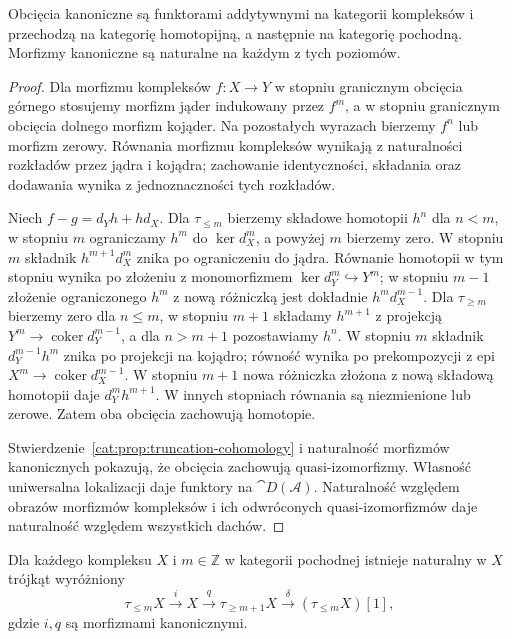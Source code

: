 \begin{stwierdzenie}\label{cat:prop:truncation-functors}
Obcięcia kanoniczne są funktorami addytywnymi na kategorii kompleksów i przechodzą na kategorię homotopijną, a następnie na kategorię pochodną. Morfizmy kanoniczne są naturalne na każdym z tych poziomów.
\end{stwierdzenie}
\begin{proof}
Dla morfizmu kompleksów $f:X\to Y$ w stopniu granicznym obcięcia górnego stosujemy morfizm jąder indukowany przez $f^m$, a w stopniu granicznym obcięcia dolnego morfizm kojąder. Na pozostałych wyrazach bierzemy $f^n$ lub morfizm zerowy. Równania morfizmu kompleksów wynikają z naturalności rozkładów przez jądra i kojądra; zachowanie identyczności, składania oraz dodawania wynika z jednoznaczności tych rozkładów.

Niech $f-g=d_Yh+hd_X$. Dla $\tau_{\le m}$ bierzemy składowe homotopii $h^n$ dla $n<m$, w stopniu $m$ ograniczamy $h^m$ do $\ker d_X^m$, a powyżej $m$ bierzemy zero. W stopniu $m$ składnik $h^{m+1}d_X^m$ znika po ograniczeniu do jądra. Równanie homotopii w tym stopniu wynika po złożeniu z monomorfizmem $\ker d_Y^m\hookrightarrow Y^m$; w stopniu $m-1$ złożenie ograniczonego $h^m$ z nową różniczką jest dokładnie $h^md_X^{m-1}$. Dla $\tau_{\ge m}$ bierzemy zero dla $n\le m$, w stopniu $m+1$ składamy $h^{m+1}$ z projekcją $Y^m\to\operatorname{coker}d_Y^{m-1}$, a dla $n>m+1$ pozostawiamy $h^n$. W stopniu $m$ składnik $d_Y^{m-1}h^m$ znika po projekcji na kojądro; równość wynika po prekompozycji z epi $X^m\to\operatorname{coker}d_X^{m-1}$. W stopniu $m+1$ nowa różniczka złożona z nową składową homotopii daje $d_Y^mh^{m+1}$. W innych stopniach równania są niezmienione lub zerowe. Zatem oba obcięcia zachowują homotopie.

Stwierdzenie~\ref{cat:prop:truncation-cohomology} i naturalność morfizmów kanonicznych pokazują, że obcięcia zachowują quasi-izomorfizmy. Własność uniwersalna lokalizacji daje funktory na $\cat D(\mathcal A)$. Naturalność względem obrazów morfizmów kompleksów i ich odwróconych quasi-izomorfizmów daje naturalność względem wszystkich dachów.
\end{proof}
\begin{twierdzenie}\label{cat:thm:canonical-truncation-triangle}
Dla każdego kompleksu $X$ i $m\in\mathbb Z$ w kategorii pochodnej istnieje naturalny w $X$ trójkąt wyróżniony
\[
 \tau_{\le m}X\xrightarrow{i}X\xrightarrow{q}\tau_{\ge m+1}X
 \xrightarrow{\delta}(\tau_{\le m}X)[1],
\]
gdzie $i,q$ są morfizmami kanonicznymi.
\end{twierdzenie}
